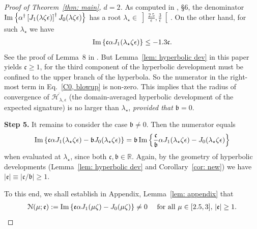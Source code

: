 \documentclass[11pt,a4paper,english,reqno]{amsart}
\theoremstyle{plain}
\newcommand{\R}{\mathbb{R}}
\newcommand{\e}{\epsilon}
\newcommand{\1}{\mathbbm{1}}
\newcommand{\bb}{{\mathfrak{b}}}
\begin{document}
\begin{proof}[Proof of Theorem~\ref{thm: main}, $d=2$]
As computed in \cite{boedihardjo2021expected}, \S 6, the denominator ${\rm Im}\left\{ \alpha^\dagger \left[J_1(\lambda\zeta \e)\right]^\dagger J_0(\lambda\zeta\e) \right\}$ has a root $\lambda_\star \in \left]\frac{2.5}{\e}, \frac{3}{\e}\right[$. On the other hand, for such $\lambda_\star$ we have
\begin{align*}
{\rm Im} \left\{\mathfrak{c} \alpha J_1(\lambda_\star \zeta \e)\right\} \leq  -1.3\mathfrak{c}.
\end{align*}
See the proof of Lemma~8 in 
\cite{boedihardjo2021expected}. 
But Lemma~\ref{lem: hyperbolic dev} in this paper yields $\mathfrak{c} \geq 1$, for the third component of the hyperbolic development must be confined to the upper branch of the hyperbola. So the numerator in the right-most term in Eq.~\eqref{C0, blowup} is non-zero. This implies that the radius of convergence of $\overline{\mathcal{H}_{\lambda,\e}}$ (the domain-averaged hyperbolic development of the expected signature) is no larger than $\lambda_\star$, \emph{provided that $\bb=0$}. 


\smallskip
\noindent
{\bf Step 5.} 
It remains to consider the case $\bb \neq 0$. Then the numerator equals
\begin{align*}
{\rm Im}\left\{\mathfrak{c}\alpha J_1(\lambda_\star\zeta\e)-\bb J_0(\lambda_\star\zeta\e)\right\} =  \bb\, {\rm Im}\left\{ \frac{\mathfrak{c}}{\bb} \alpha J_1(\lambda_\star \zeta \e) - J_0(\lambda_\star\zeta \e) \right\}
\end{align*}
when evaluated at $\lambda_\star$, since both $\mathfrak{c},\bb\in\R$. Again, by the geometry of hyperbolic developments (Lemma~\ref{lem: hyperbolic dev} and Corollary~\ref{cor: new}) we have $|\mathfrak{e}|\equiv|\mathfrak{c}\slash\bb|\geq 1$.


To this end, we shall establish in Appendix, Lemma~\ref{lem: appendix} that
\begin{align}\label{N, mu, e, WTS}
\mathcal{N}(\mu;\mathfrak{e}) := {\rm Im}\left\{ \mathfrak{e} \alpha J_1(\mu\zeta) - J_0(\mu\zeta) \right\} \neq 0\quad\text{ for all } \mu \in [2.5,3],\,|\mathfrak{e}|\geq 1.
\end{align}

\end{proof}
\end{document}
